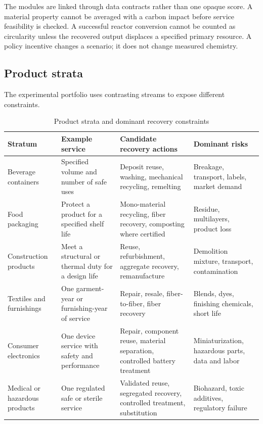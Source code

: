 \documentclass[conference]{IEEEtran}
\begin{document}
The modules are linked through data contracts rather than one opaque score. A material property cannot be averaged with a carbon impact before service feasibility is checked. A successful reactor conversion cannot be counted as circularity unless the recovered output displaces a specified primary resource. A policy incentive changes a scenario; it does not change measured chemistry.

\subsection{Product strata}

The experimental portfolio uses contrasting streams to expose different constraints.

\begin{table}[t]
\caption{Product strata and dominant recovery constraints}
\label{tab:strata}
\centering
\footnotesize
\setlength{\tabcolsep}{3pt}
\begin{tabular}{p{}p{}p{}p{}}
\toprule
Stratum & Example service & Candidate recovery actions & Dominant risks\\
\midrule
Beverage containers & Specified volume and number of safe uses & Deposit reuse, washing, mechanical recycling, remelting & Breakage, transport, labels, market demand\\
Food packaging & Protect a product for a specified shelf life & Mono-material recycling, fiber recovery, composting where certified & Residue, multilayers, product loss\\
Construction products & Meet a structural or thermal duty for a design life & Reuse, refurbishment, aggregate recovery, remanufacture & Demolition mixture, transport, contamination\\
Textiles and furnishings & One garment-year or furnishing-year of service & Repair, resale, fiber-to-fiber, fiber recovery & Blends, dyes, finishing chemicals, short life\\
Consumer electronics & One device service with safety and performance & Repair, component reuse, material separation, controlled battery treatment & Miniaturization, hazardous parts, data and labor\\
Medical or hazardous products & One regulated safe or sterile service & Validated reuse, segregated recovery, controlled treatment, substitution & Biohazard, toxic additives, regulatory failure\\
\bottomrule
\end{tabular}
\end{table}
\end{document}

